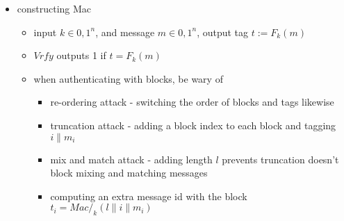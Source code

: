 \documentclass[11pt]{article}
\newcommand{\ee}[1]{\ensuremath{#1}}
\begin{document}
\begin{description}
\begin{itemize}
	\item constructing Mac
	\begin{itemize}
		\item input \ee{k \in {0,1}^n}, and message \ee{m \in {0,1}^n}, output tag \ee{t:=F_k(m)}
		\item \ee{\mathit{Vrfy}} outputs 1 if \ee{t = F_k(m)}
		\item when authenticating with blocks, be wary of 
		\begin{itemize}
			\item re-ordering attack - switching the order of blocks and tags likewise
			\item truncation attack - adding a block index to each block and tagging \ee{i\|m_i}
			\item mix and match attack - adding length \ee{l} prevents truncation doesn't block mixing and matching messages
			\item computing an extra message id with the block \ee{t_i=\mathit{Mac}/_k(l \| i \| m_i)}
		\end{itemize}
	\end{itemize}
\end{itemize}
  

\end{description}
\end{document}
